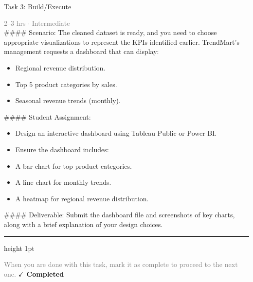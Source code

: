 \documentclass[10pt,a4paper]{article}
\begin{document}
\begin{taskbox}{Task 3: Build/Execute}

    {\small \textcolor{gray}{2--3 hrs $\cdot$ Intermediate}}\\[12pt]

    \#\#\#\# Scenario:
The cleaned dataset is ready, and you need to choose appropriate visualizations to represent the KPIs identified earlier. TrendMart’s management requests a dashboard that can display:
\begin{itemize}
    \item Regional revenue distribution.
    \item Top 5 product categories by sales.
    \item Seasonal revenue trends (monthly).
\end{itemize}

\#\#\#\# Student Assignment:
\begin{itemize}
    \item Design an interactive dashboard using Tableau Public or Power BI.
    \item Ensure the dashboard includes:
    \item A bar chart for top product categories.
    \item A line chart for monthly trends.
    \item A heatmap for regional revenue distribution.
\end{itemize}

\#\#\#\# Deliverable:
Submit the dashboard file and screenshots of key charts, along with a brief explanation of your design choices.\par

    \vspace{16pt}

    \textcolor{cardBorder}{\hrule height 1pt}\vspace{8pt}

    \small \textcolor{gray}{When you are done with this task, mark it as complete to proceed to the next one.} \hfill \textbf{\textcolor{brandDark}{$\checkmark$ Completed}}

\end{taskbox}
\end{document}
